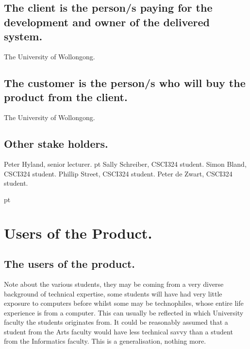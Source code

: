 \subsection{The client is the person/s paying for the development and owner of the delivered system.}

The University of Wollongong.

\subsection{The customer is the person/s who will buy the product from the client.}

The University of Wollongong.

\subsection{Other stake holders.}


\items Peter Hyland, senior lecturer.
 pt
\items Sally Schreiber, CSCI324 student.
\items Simon Bland, CSCI324 student.
\items Phillip Street, CSCI324 student.
\items Peter de Zwart, CSCI324 student.

 pt

\section{Users of the Product.}

\subsection{The users of the product.}

Note about the various students, they may be coming from a very diverse background of technical expertise, some students will have had very little exposure to computers before whilst some may be technophiles, whose entire life experience is from a computer. This can usually be reflected in which University faculty the students originates from. It could be reasonably assumed that a student from the Arts faculty would have less technical
savvy than a student from the Informatics faculty. This is a generalisation, nothing more.



